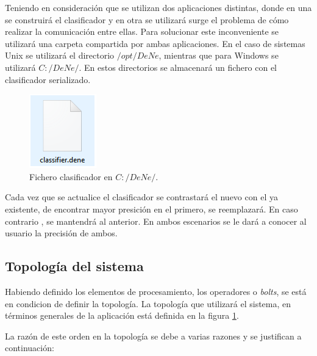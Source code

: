 Teniendo en consideración que se utilizan dos aplicaciones distintas, donde en una se construirá el clasificador y en otra se utilizará surge el problema de cómo realizar la comunicación entre ellas. Para solucionar este inconveniente se utilizará una carpeta compartida por ambas aplicaciones. En el caso de sistemas Unix se utilizará el directorio $/opt/DeNe$, mientras que para Windows se utilizará $C:/DeNe/$. En estos directorios se almacenará un fichero con el clasificador serializado.

\begin{figure}[H]
	\centering
	\captionsetup{justification=centering}
	\includegraphics[scale=0.8]{images/ClasifierDene.png}
	\caption[Fichero clasificador en $c:/DeNe/$.]{Fichero clasificador en $C:/DeNe/$.}
	\label{fig:TopologiaGeneral}
\end{figure}

Cada vez que se actualice el clasificador se contrastará el nuevo con el ya existente, de encontrar mayor presición en el primero, se reemplazará. En caso contrario , se mantendrá al anterior. En ambos escenarios se le dará a conocer al usuario la precisión de ambos.

\subsection{Topología del sistema}
\label{subsec:topologiaSistema}

Habiendo definido los elementos de procesamiento, los operadores o \textit{bolts}, se está en condicion de definir la topología. La topología que utilizará el sistema, en términos generales de la aplicación está definida en la figura \ref{fig:TopologiaGeneral}.

La razón de este orden en la topología se debe a varias razones y se justifican a continuación:

